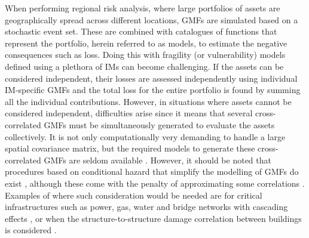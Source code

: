 When performing regional risk analysis, where large portfolios of assets are geographically spread across different locations, \acp{GMF} are simulated based on a stochastic event set. These are combined with catalogues of functions that represent the portfolio, herein referred to as models, to estimate the negative consequences such as loss. Doing this with fragility (or vulnerability) models defined using a plethora of \acp{IM} can become challenging. If the assets can be considered independent, their losses are assessed independently using individual \ac{IM}-specific \acp{GMF} and the total loss for the entire portfolio is found by summing all the individual contributions. However, in situations where assets cannot be considered independent, difficulties arise since it means that several cross-correlated \acp{GMF} must be simultaneously generated to evaluate the assets collectively. It is not only computationally very demanding to handle a large spatial covariance matrix, but the required models to generate these cross-correlated \acp{GMF} are seldom available \citep[e.g.,][]{MonteiroOReilly2026}. However, it should be noted that procedures based on conditional hazard that simplify the modelling of \acp{GMF} do exist \citep[e.g.,][]{Weatherill2015}, although these come with the penalty of approximating some correlations \citep[e.g.,][]{Goda2008}. Examples of where such consideration would be needed are for critical infrastructures such as power, gas, water and bridge networks with cascading effects \citep[e.g.,][]{Franchin2015, Esposito2015, Abarca2022a, Abarca2023}, or when the structure-to-structure damage correlation between buildings is considered \citep[][]{Heresi2022, Mejia2025}. 

